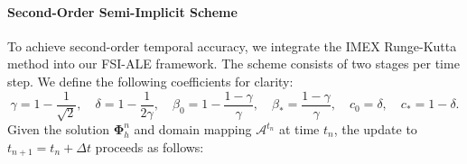 \documentclass{article}
\newcommand\tu{{\tilde{\mathbf{u}}}}
\newcommand\tU{{\tilde{\mathbf{U}}}}
\newcommand\tomega{{\tilde{\boldsymbol{\omega}}}}
\begin{document}
\paragraph{Second-Order Semi-Implicit Scheme}
To achieve second-order temporal accuracy, we integrate the IMEX Runge-Kutta method into our FSI-ALE framework. The scheme consists of two stages per time step. We define the following coefficients for clarity:
\[
    \gamma = 1 - \frac{1}{\sqrt{2}}, \quad
    \delta = 1 - \frac{1}{2\gamma}, \quad
    \beta_0 = 1-\frac{1-\gamma}{\gamma}, \quad
    \beta_* = \frac{1-\gamma}{\gamma}, \quad
    c_0 = \delta, \quad
    c_* = 1-\delta.
\]
Given the solution $\boldsymbol{\Phi}_h^n$ and domain mapping $\mathcal{A}^{t_n}$ at time $t_n$, the update to $t_{n+1} = t_n + \Delta t$ proceeds as follows:

\end{document}
